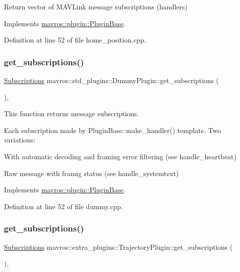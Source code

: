 Return vector of M\+A\+V\+Link message subscriptions (handlers) 



Implements \mbox{\hyperlink{group__plugin_gaf4e23fec6d7436a62cbf0942a2e5791c}{mavros\+::plugin\+::\+Plugin\+Base}}.



Definition at line 52 of file home\+\_\+position.\+cpp.

\mbox{\label{group__plugin_gaf24dcc35ae67b2e6842effce1e9c3803}} 
\subsubsection{\texorpdfstring{get\_subscriptions()}{get\_subscriptions()}\hspace{0.1cm}{\footnotesize\ttfamily [17/41]}}
{\footnotesize\ttfamily \mbox{\hyperlink{group__plugin_ga8967d61fc77040e0c3ea5a4585d62a09}{Subscriptions}} mavros\+::std\+\_\+plugins\+::\+Dummy\+Plugin\+::get\+\_\+subscriptions (\begin{DoxyParamCaption}{ }\end{DoxyParamCaption})\hspace{0.3cm}{\ttfamily [inline]}, {\ttfamily [virtual]}}

This function returns message subscriptions.

Each subscription made by Plugin\+Base\+::make\+\_\+handler() template. Two variations\+:
\begin{DoxyItemize}
\item With automatic decoding and framing error filtering (see handle\+\_\+heartbeat)
\item Raw message with framig status (see handle\+\_\+systemtext) 
\end{DoxyItemize}

Implements \mbox{\hyperlink{group__plugin_gaf4e23fec6d7436a62cbf0942a2e5791c}{mavros\+::plugin\+::\+Plugin\+Base}}.



Definition at line 52 of file dummy.\+cpp.

\mbox{\label{group__plugin_gaae780d771bd0792a591dc341783cf8de}} 
\subsubsection{\texorpdfstring{get\_subscriptions()}{get\_subscriptions()}\hspace{0.1cm}{\footnotesize\ttfamily [18/41]}}
{\footnotesize\ttfamily \mbox{\hyperlink{group__plugin_ga8967d61fc77040e0c3ea5a4585d62a09}{Subscriptions}} mavros\+::extra\+\_\+plugins\+::\+Trajectory\+Plugin\+::get\+\_\+subscriptions (\begin{DoxyParamCaption}{ }\end{DoxyParamCaption})\hspace{0.3cm}{\ttfamily [inline]}, {\ttfamily [virtual]}}



